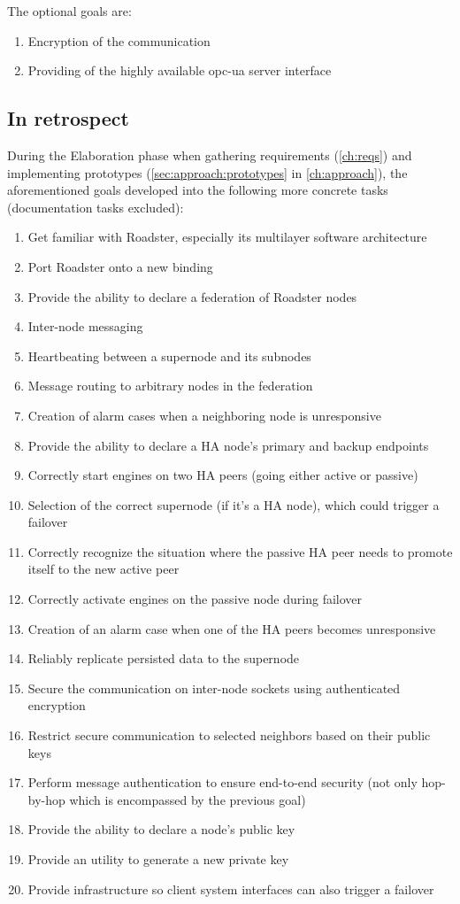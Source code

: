 The optional goals are:

\begin{enumerate}
	\item Encryption of the communication
	\item Providing of the highly available \gls{opc-ua} server interface
\end{enumerate}


\subsection{In retrospect}
During the Elaboration phase when gathering requirements (\autoref{ch:reqs})
and implementing prototypes (\autoref{sec:approach:prototypes} in \autoref{ch:approach}), the
aforementioned goals developed into the following more concrete tasks
(documentation tasks excluded):

\begin{enumerate}
	\item Get familiar with Roadster, especially its multilayer software architecture
	\item Port Roadster onto a new \zmq binding
	\item Provide the ability to declare a federation of Roadster nodes
	\item Inter-node messaging
	\item Heartbeating between a supernode and its subnodes
	\item Message routing to arbitrary nodes in the federation
	\item Creation of alarm cases when a neighboring node is unresponsive
	\item Provide the ability to declare a HA node's primary and backup endpoints
	\item Correctly start engines on two HA peers (going either active or passive)
	\item Selection of the correct supernode (if it's a HA node), which could trigger a failover
	\item Correctly recognize the situation where the passive HA peer needs
		to promote itself to the new active peer
	\item Correctly activate engines on the passive node during failover
	\item Creation of an alarm case when one of the HA peers becomes unresponsive
	\item Reliably replicate persisted data to the supernode
	\item Secure the communication on inter-node sockets using authenticated encryption
	\item Restrict secure communication to selected neighbors based on their public keys
	\item Perform message authentication to ensure end-to-end security (not
		only hop-by-hop which is encompassed by the previous goal)
	\item Provide the ability to declare a node's public key
	\item Provide an utility to generate a new private key
	\item Provide infrastructure so client system interfaces can also trigger a failover
\end{enumerate}


